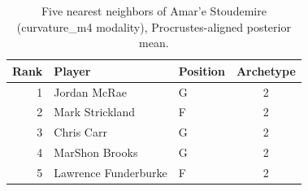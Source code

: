 \begin{table}[htbp]
  \centering\small
  \begin{tabular}{rllc}
    \toprule
    Rank & Player & Position & Archetype \\
    \midrule
    1 & Jordan McRae & G & 2 \\
    2 & Mark Strickland & F & 2 \\
    3 & Chris Carr & G & 2 \\
    4 & MarShon Brooks & G & 2 \\
    5 & Lawrence Funderburke & F & 2 \\
    \bottomrule
  \end{tabular}
  \caption{Five nearest neighbors of Amar'e Stoudemire (curvature_m4 modality), Procrustes-aligned posterior mean.}
  \label{tab:Amar_e_Stoudemire_neighbors_curvature_m4}
\end{table}

